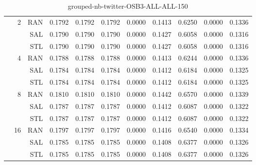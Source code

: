\begin{center}
\begin{table}[htbp]
\begin{tabular}{ | r | r | r | r | r | r | r | r | r | r | r |}
 & \multirow{3}{*}{2} & RAN & 0.1792 & 0.1792 & 0.1792 & 0.0000 & 0.1413 & 0.6250 & 0.0000 & 0.1336\\ \cline{3-11}
 &   & SAL & 0.1790 & 0.1790 & 0.1790 & 0.0000 & 0.1427 & 0.6058 & 0.0000 & 0.1316\\ \cline{3-11}
 &   & STL & 0.1790 & 0.1790 & 0.1790 & 0.0000 & 0.1427 & 0.6058 & 0.0000 & 0.1316\\ \cline{2-11}
 & \multirow{3}{*}{4} & RAN & 0.1788 & 0.1788 & 0.1788 & 0.0000 & 0.1413 & 0.6244 & 0.0000 & 0.1336\\ \cline{3-11}
 &   & SAL & 0.1784 & 0.1784 & 0.1784 & 0.0000 & 0.1412 & 0.6184 & 0.0000 & 0.1325\\ \cline{3-11}
 &   & STL & 0.1784 & 0.1784 & 0.1784 & 0.0000 & 0.1412 & 0.6184 & 0.0000 & 0.1325\\ \cline{2-11}
 & \multirow{3}{*}{8} & RAN & 0.1810 & 0.1810 & 0.1810 & 0.0000 & 0.1442 & 0.6570 & 0.0000 & 0.1339\\ \cline{3-11}
 &   & SAL & 0.1787 & 0.1787 & 0.1787 & 0.0000 & 0.1412 & 0.6087 & 0.0000 & 0.1322\\ \cline{3-11}
 &   & STL & 0.1787 & 0.1787 & 0.1787 & 0.0000 & 0.1412 & 0.6087 & 0.0000 & 0.1322\\ \cline{2-11}
 & \multirow{3}{*}{16} & RAN & 0.1797 & 0.1797 & 0.1797 & 0.0000 & 0.1416 & 0.6540 & 0.0000 & 0.1334\\ \cline{3-11}
 &   & SAL & 0.1785 & 0.1785 & 0.1785 & 0.0000 & 0.1408 & 0.6377 & 0.0000 & 0.1326\\ \cline{3-11}
 &   & STL & 0.1785 & 0.1785 & 0.1785 & 0.0000 & 0.1408 & 0.6377 & 0.0000 & 0.1326\\ \cline{2-11}
\hline
\end{tabular}
\caption{grouped-nb-twitter-OSB3-ALL-ALL-150}
\end{table}
\end{center}

